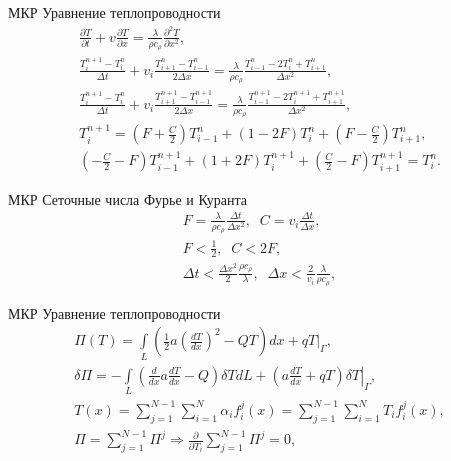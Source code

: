 \documentclass[12pt]{beamer}
\begin{document}
\begin{frame}{МКР Уравнение теплопроводности}
    \begin{eqnarray}
        \frac{\partial T}{\partial t} + v \frac{\partial T}{\partial x}  =  \frac{\lambda}{\rho c_{\rho}} \frac{\partial^2 T}{\partial x^2},\\
        \frac{T_i^{n+1} - T_i^{n}}{\Delta t} + v_{i}\frac{T_{i+1}^{n}-T_{i-1}^{n}}{2\Delta x} =  \frac{\lambda}{\rho c_{\rho}}\frac{T_{i-1}^{n} - 2T_i^{n} + T_{i+1}^{n}}{\Delta x^2},\\
        \frac{T_i^{n+1} - T_i^{n}}{\Delta t} + v_{i}\frac{T_{i+1}^{n+1}-T_{i-1}^{n+1}}{2\Delta x} =  \frac{\lambda}{\rho c_{\rho}}\frac{T_{i-1}^{n+1} - 2T_i^{n+1} + T_{i+1}^{n+1}}{\Delta x^2},\\       
        T_i^{n+1} = \left(F + \frac{C}{2} \right) T_{i-1}^{n} + \left(1 - 2F \right) T_i^{n} + \left(F - \frac{C}{2} \right) T_{i+1}^{n},\\
        \left(-\frac{C}{2} - F \right) T_{i-1}^{n+1} + \left(1 + 2F \right) T_i^{n+1} + \left(\frac{C}{2} - F \right) T_{i+1}^{n+1} = T_i^{n}.
    \end{eqnarray}
\end{frame}

\begin{frame}{МКР Сеточные числа Фурье и Куранта}
    \begin{eqnarray}
        F = \frac{\lambda}{\rho c_{\rho}} \frac{\Delta t}{\Delta x^2}, \; \; C = v_{i} \frac{\Delta t}{\Delta x},\\
        F < \frac{1}{2}, \; \; C < 2F,\\
        \Delta t < \frac{\Delta x^2}{2} \frac{\rho c_{\rho}}{\lambda}, \; \; \Delta x < \frac{2}{v_{i}} \frac{\lambda}{\rho c_{\rho}},
    \end{eqnarray}
\end{frame}

\begin{frame}{МКР Уравнение теплопроводности}
 \begin{eqnarray}
    \Pi\left(T\right) = \int \limits_{L} \left(\frac{1}{2}a \left(\frac{d T}{d x}\right)^2 - QT\right)dx +
        \left.  q  T \right|_\Gamma,\\
        \delta \Pi = - \int \limits_{L} \left(\frac{d}{dx}a\frac{dT}{dx} - Q\right) \delta T dL +
    \left.  \left(a\frac{dT}{dx} + q  T \right) \delta T\right|_\Gamma,\\
    T\left(x\right) = \sum\limits_{j=1}^{N-1}\sum\limits_{i=1}^N \alpha_i f^j_i\left(x\right)=
       \sum\limits_{j=1}^{N-1} \sum\limits_{i=1}^N T_i f^j_i\left(x\right),\\    
    \Pi = \sum\limits_{j=1}^{N-1} \Pi^j \Rightarrow  \frac{\partial}{\partial T_i} \sum\limits_{j=1}^{N-1} \Pi^j= 0,
    \end{eqnarray}
\end{frame}
\end{document}

